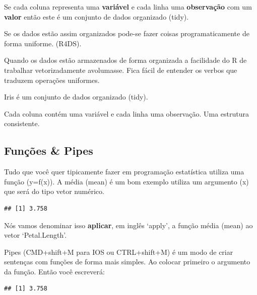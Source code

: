 \documentclass[
]{article}
\newenvironment{Shaded}{\begin{snugshade}}{\end{snugshade}}
\newcommand{\FunctionTok}[1]{\textcolor[rgb]{0.00,0.00,0.00}{#1}}
\newcommand{\NormalTok}[1]{#1}
\newcommand{\SpecialCharTok}[1]{\textcolor[rgb]{0.00,0.00,0.00}{#1}}
\begin{document}
Se cada coluna representa uma \textbf{variável} e cada linha uma
\textbf{observação} com um \textbf{valor} então este é um conjunto de
dados organizado (tidy).

Se os dados estão assim organizados pode-se fazer coisas
programaticamente de forma uniforme. (R4DS).

Quando os dados estão armazenados de forma organizada a facilidade do R
de trabalhar vetorizadamente avolumasse. Fica fácil de entender os
verbos que traduzem operações uniformes.

Iris é um conjunto de dados organizado (tidy).

Cada coluna contém uma variável e cada linha uma observação. Uma
estrutura consistente.

\hypertarget{funuxe7uxf5es-pipes}{%
\subsection{Funções \& Pipes}\label{funuxe7uxf5es-pipes}}

Tudo que você quer tipicamente fazer em programação estatística utiliza
uma função (y=f(x)). A média (mean) é um bom exemplo utiliza um
argumento (x) que será do tipo vetor numérico.

\begin{Shaded}
\end{Shaded}

\begin{verbatim}
## [1] 3.758
\end{verbatim}

Nós vamos denominar isso \textbf{aplicar}, em inglês `apply', a função
média (mean) ao vetor `Petal.Length'.

Pipes (CMD+shift+M para IOS ou CTRL+shift+M) é um modo de criar
sentenças com funções de forma mais simples. Ao colocar primeiro o
argumento da função. Então você escreverá:

\begin{Shaded}
\end{Shaded}

\begin{verbatim}
## [1] 3.758
\end{verbatim}
\end{document}
